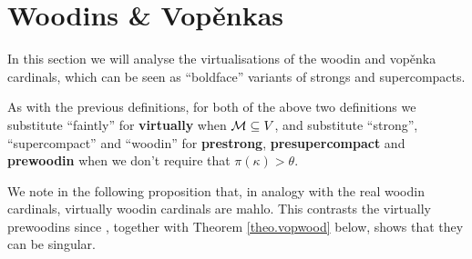 \documentclass[../../main]{subfiles}
\begin{document}
\section{Woodins \& Vop\v enkas}

In this section we will analyse the virtualisations of the woodin and vop\v enka cardinals, which can be seen as ``boldface'' variants of strongs and supercompacts.



As with the previous definitions, for both of the above two definitions we substitute ``faintly'' for \textbf{virtually} when $\operatorname{\mathcal M}\subseteq V$, and substitute ``strong'', ``supercompact'' and ``woodin'' for \textbf{prestrong}, \textbf{presupercompact} and \textbf{prewoodin} when we don't require that $\pi(\kappa)>\theta$.

\qquad We note in the following proposition that, in analogy with the real woodin cardinals, virtually woodin cardinals are mahlo. This contrasts the virtually prewoodins since \cite{WilsonVopenka}, together with Theorem \ref{theo.vopwood} below, shows that they can be singular.
\end{document}

